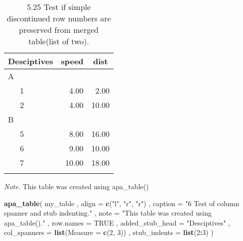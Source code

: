 \documentclass[english,man]{apa6}
\newenvironment{Shaded}{\begin{snugshade}}{\end{snugshade}}
\newcommand{\DataTypeTok}[1]{\textcolor[rgb]{0.13,0.29,0.53}{#1}}
\newcommand{\DecValTok}[1]{\textcolor[rgb]{0.00,0.00,0.81}{#1}}
\newcommand{\KeywordTok}[1]{\textcolor[rgb]{0.13,0.29,0.53}{\textbf{#1}}}
\newcommand{\NormalTok}[1]{#1}
\newcommand{\OperatorTok}[1]{\textcolor[rgb]{0.81,0.36,0.00}{\textbf{#1}}}
\newcommand{\OtherTok}[1]{\textcolor[rgb]{0.56,0.35,0.01}{#1}}
\newcommand{\StringTok}[1]{\textcolor[rgb]{0.31,0.60,0.02}{#1}}
\begin{document}
\begin{table}[tbp]

\begin{center}
\begin{threeparttable}

\caption{\label{tab:unnamed-chunk-12}5.25 Test if simple discontinued row numbers are preserved from merged table(list of two).}

\begin{tabular}{lrr}
\toprule
Desciptives & \multicolumn{1}{c}{speed} & \multicolumn{1}{c}{dist}\\
\midrule
A &  & \\
\ \ \ 1 & 4.00 & 2.00\\
\ \ \ 2 & 4.00 & 10.00\\
B &  & \\
\ \ \ 5 & 8.00 & 16.00\\
\ \ \ 6 & 9.00 & 10.00\\
\ \ \ 7 & 10.00 & 18.00\\
\bottomrule
\addlinespace
\end{tabular}

\begin{tablenotes}[para]
\normalsize{\textit{Note.} This table was created using apa\_table()}
\end{tablenotes}

\end{threeparttable}
\end{center}

\end{table}

\begin{Shaded}
\begin{Highlighting}[]
\KeywordTok{apa_table}\NormalTok{(}
\NormalTok{  my_table}
\NormalTok{  , }\DataTypeTok{align =} \KeywordTok{c}\NormalTok{(}\StringTok{"l"}\NormalTok{, }\StringTok{"r"}\NormalTok{, }\StringTok{"r"}\NormalTok{)}
\NormalTok{  , }\DataTypeTok{caption =} \StringTok{"6 Test of column spanner and stub indenting."}
\NormalTok{  , }\DataTypeTok{note =} \StringTok{"This table was created using apa_table()."}
\NormalTok{  , }\DataTypeTok{row.names =} \OtherTok{TRUE}
\NormalTok{  , }\DataTypeTok{added_stub_head =} \StringTok{"Desciptives"}
\NormalTok{  , }\DataTypeTok{col_spanners =} \KeywordTok{list}\NormalTok{(}\DataTypeTok{Measure =} \KeywordTok{c}\NormalTok{(}\DecValTok{2}\NormalTok{, }\DecValTok{3}\NormalTok{))}
\NormalTok{  , }\DataTypeTok{stub_indents =} \KeywordTok{list}\NormalTok{(}\DecValTok{2}\OperatorTok{:}\DecValTok{3}\NormalTok{)}
\NormalTok{)}
\end{Highlighting}
\end{Shaded}
\end{document}
